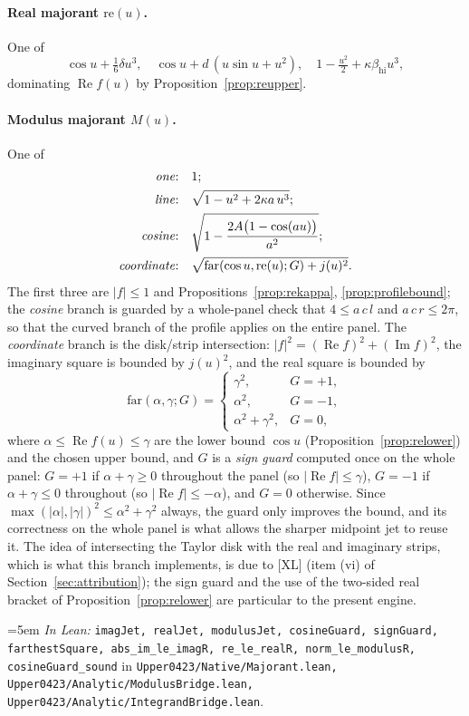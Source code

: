 \documentclass[11pt,a4paper]{article}
\theoremstyle{definition}
\newcommand{\kap}{\kappa}
\newcommand{\Lean}[1]{\texttt{#1}}
\newcommand{\file}[1]{\texttt{#1}}
\newcommand{\formal}[2]{%
  \par\smallskip
  \begingroup\small\raggedright\emergencystretch=5em
  \noindent\textit{In Lean:} \Lean{#1} in \file{#2}.\par
  \endgroup\smallskip}
\begin{document}
\paragraph{Real majorant $\mathrm{re}(u)$.} One of
\[
  \cos u+\tfrac16\delta u^3,\quad
  \cos u+d\,(u\sin u+u^2),\quad
  1-\tfrac{u^2}2+\kap\beta_{\mathrm{hi}}u^3,
\]
dominating $\operatorname{Re}f(u)$ by Proposition~\ref{prop:reupper}.

\paragraph{Modulus majorant $M(u)$.} One of
\begin{align*}
  \text{\emph{one}:}\quad& 1;\\
  \text{\emph{line}:}\quad& \sqrt{1-u^2+2\kap a\,u^3};\\
  \text{\emph{cosine}:}\quad& \sqrt{1-\dfrac{2A\bigl(1-\cos(a u)\bigr)}{a^2}};\\
  \text{\emph{coordinate}:}\quad& \sqrt{\mathrm{far}(\cos u,\mathrm{re}(u);G)+j(u)^2} .
\end{align*}
The first three are $|f|\le1$ and Propositions~\ref{prop:rekappa},
\ref{prop:profilebound}; the \emph{cosine} branch is guarded by a whole-panel
check that $4\le a\,c\,l$ and $a\,c\,r\le2\pi$, so that the curved branch of the
profile applies on the entire panel. The \emph{coordinate} branch is the
disk/strip intersection: $|f|^2=(\operatorname{Re}f)^2+(\operatorname{Im}f)^2$,
the imaginary square is bounded by $j(u)^2$, and the real square is bounded by
\[
  \mathrm{far}(\alpha,\gamma;G)=
  \begin{cases}
    \gamma^2, & G=+1,\\
    \alpha^2, & G=-1,\\
    \alpha^2+\gamma^2, & G=0,
  \end{cases}
\]
where $\alpha\le\operatorname{Re}f(u)\le\gamma$ are the lower bound $\cos u$
(Proposition~\ref{prop:relower}) and the chosen upper bound, and $G$ is a
\emph{sign guard} computed once on the whole panel: $G=+1$ if $\alpha+\gamma\ge0$
throughout the panel (so $|\operatorname{Re}f|\le\gamma$), $G=-1$ if
$\alpha+\gamma\le0$ throughout (so $|\operatorname{Re}f|\le-\alpha$), and $G=0$
otherwise. Since $\max(|\alpha|,|\gamma|)^2\le\alpha^2+\gamma^2$ always, the
guard only improves the bound, and its correctness on the whole panel is what
allows the sharper midpoint jet to reuse it. The idea of intersecting the Taylor
disk with the real and imaginary strips, which is what this branch implements, is
due to [XL] (item (vi) of Section~\ref{sec:attribution}); the sign guard and the
use of the two-sided real bracket of Proposition~\ref{prop:relower} are
particular to the present engine.
\formal{imagJet, realJet, modulusJet, cosineGuard, signGuard, farthestSquare, abs\_im\_le\_imagR, re\_le\_realR, norm\_le\_modulusR, cosineGuard\_sound}{Upper0423/Native/Majorant.lean, Upper0423/Analytic/ModulusBridge.lean, Upper0423/Analytic/IntegrandBridge.lean}
\end{document}
